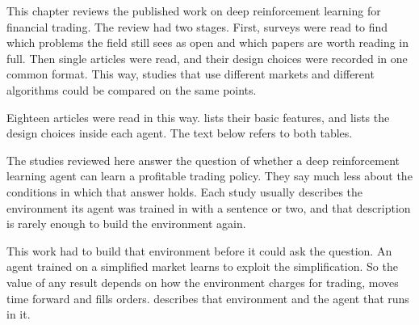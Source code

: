 \label{Chapter:RelatedWork}

This chapter reviews the published work on deep reinforcement learning for financial trading. The review had two stages. First, surveys were read to find which problems the field still sees as open and which papers are worth reading in full. Then single articles were read, and their design choices were recorded in one common format. This way, studies that use different markets and different algorithms could be compared on the same points.

Eighteen articles were read in this way.  lists their basic features, and  lists the design choices inside each agent. The text below refers to both tables.







The studies reviewed here answer the question of whether a deep reinforcement learning agent can learn a profitable trading policy. They say much less about the conditions in which that answer holds. Each study usually describes the environment its agent was trained in with a sentence or two, and that description is rarely enough to build the environment again.

This work had to build that environment before it could ask the question. An agent trained on a simplified market learns to exploit the simplification. So the value of any result depends on how the environment charges for trading, moves time forward and fills orders.  describes that environment and the agent that runs in it.